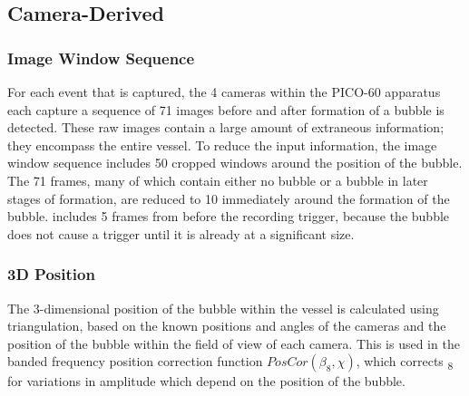 \documentclass[12pt]{article}
\begin{document}
\subsection{Camera-Derived}

\subsubsection{Image Window Sequence}

For each event that is captured, the 4 cameras within the PICO-60 apparatus each capture a sequence of 71 images before and after formation of a bubble is detected. These raw images contain a large amount of extraneous information; they encompass the entire vessel. To reduce the input information, the image window sequence \textiota includes 50 cropped windows around the position of the bubble. The 71 frames, many of which contain either no bubble or a bubble in later stages of formation, are reduced to 10 immediately around the formation of the bubble. \textiota includes 5 frames from before the recording trigger, because the bubble does not cause a trigger until it is already at a significant size.

\subsubsection{3D Position}

The 3-dimensional position \textchi{} of the bubble within the vessel is calculated using triangulation, based on the known positions and angles of the cameras and the position of the bubble within the field of view of each camera. This is used in the banded frequency position correction function $PosCor(\beta _{8}, \chi)$, which corrects \textbeta \textsubscript{8} for variations in amplitude which depend on the position of the bubble.
\end{document}
